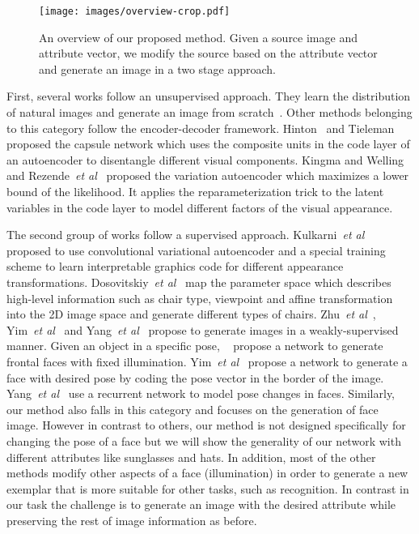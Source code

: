 \documentclass[10pt,twocolumn,letterpaper]{article}
\def\etal{\emph{et al}\onedot}
\begin{document}
\begin{figure*}[t]
\begin{center}
    \texttt{[image: images/overview-crop.pdf]}
\end{center}
\caption{An overview of our proposed method. Given a source image and attribute vector, we modify the source based on the attribute vector and generate an image in a two stage approach.}
\label{fig:overview}
\end{figure*}

First, several works follow an unsupervised approach.
They learn the distribution of natural images and generate an image from scratch~\cite{Denton-nips15, Gauthier-14, Goodfellow-nips14, Li-icml15}.
Other methods belonging to this category follow the encoder-decoder framework.
Hinton~\cite{Hinton-icann11} and Tieleman~\cite{Tieleman-Thesis} proposed the capsule network
which uses the composite units in the code layer of an autoencoder to disentangle different visual components.
Kingma and Welling~\cite{Kingma-iclr14} and Rezende~\etal~\cite{Rezende-icml14} proposed the variation autoencoder
which maximizes a lower bound of the likelihood.
It applies the reparameterization trick to the latent variables in the code layer to model different factors of the visual appearance.

The second group of works follow a supervised approach.
Kulkarni~\etal~\cite{Kulkarni-nips15} proposed to use convolutional variational autoencoder and a special training scheme to learn interpretable graphics code for different appearance transformations.
Dosovitskiy~\etal~\cite{Dosovitskiy-cvpr15} map the parameter space which describes high-level information
such as chair type, viewpoint and affine transformation into the 2D image space and generate different types of chairs.
Zhu~\etal~\cite{zhu2013deep,zhu-nips14}, Yim~\etal~\cite{Yim-cvpr15} and Yang~\etal~\cite{Yang-nips15}
propose to generate images in a weakly-supervised manner.
Given an object in a specific pose, ~\cite{zhu2013deep} propose a network to generate frontal faces with fixed illumination.
Yim~\etal~\cite{Yim-cvpr15} propose a network to generate a face with desired pose by coding the pose vector in the border of the image.
Yang~\etal~\cite{Yang-nips15} use a recurrent network to model pose changes in faces.
Similarly, our method also falls in this category and focuses on the generation of face image. However in contrast to others, our method is not designed specifically for changing the pose of a face but we will show the generality of our network with different attributes like sunglasses and hats. In addition, most of the other methods modify other aspects of a face (\eg illumination) in order to generate a new exemplar that is more suitable for other tasks, such as recognition. In contrast in our task the challenge is to generate an image with the desired attribute while preserving the rest of image information as before.
\end{document}
